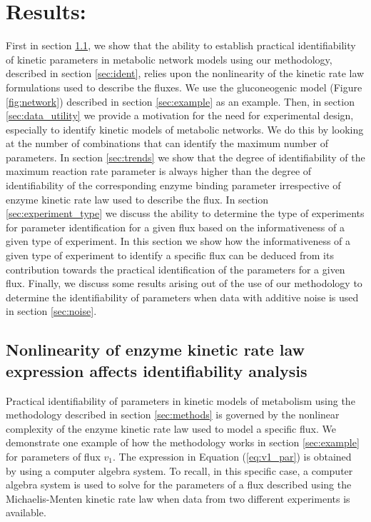 \documentclass[10pt]{article}
\begin{document}
	\section{Results:}
	First in section \ref{sec:closedform}, we show that the ability to establish practical identifiability of kinetic parameters in metabolic network models using our methodology, described in section \ref{sec:ident}, relies upon the nonlinearity of the kinetic rate law formulations used to describe the fluxes. We use the gluconeogenic model (Figure \ref{fig:network}) described in section \ref{sec:example} as an example. 
	Then, in section \ref{sec:data_utility} we provide a motivation for the need for experimental design, especially to identify kinetic models of metabolic networks. We do this by looking at the number of combinations that can identify the maximum number of parameters. 
	In section \ref{sec:trends} we show that the degree of identifiability of the maximum reaction rate parameter is always higher than the degree of identifiability of the corresponding enzyme binding parameter irrespective of enzyme kinetic rate law used to describe the flux. 
	In section \ref{sec:experiment_type} we discuss the ability to determine the type of experiments for parameter identification for a given flux based on the informativeness of a given type of experiment. In this section we show how the informativeness of a given type of experiment to identify a specific flux can be deduced from its contribution towards the practical identification of the parameters for a given flux. Finally, we discuss some results arising out of the use of our methodology to determine the identifiability of parameters when data with additive noise is used in section \ref{sec:noise}.
	
	\subsection{Nonlinearity of enzyme kinetic rate law expression affects identifiability analysis}\label{sec:closedform}
	Practical identifiability of parameters in kinetic models of metabolism using the methodology described in section \ref{sec:methods} is governed by the nonlinear complexity of the enzyme kinetic rate law used to model a specific flux. We demonstrate one example of how the methodology works in section \ref{sec:example} for parameters of flux $v_1$. The expression in Equation (\ref{eq:v1_par}) is obtained by using a computer algebra system. To recall, in this specific case, a computer algebra system is used to solve for the parameters of a flux described using the Michaelis-Menten kinetic rate law when data from two different experiments is available. 
	
\end{document}
